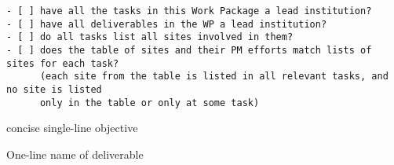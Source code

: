 \begin{draft}
\begin{verbatim}
- [ ] have all the tasks in this Work Package a lead institution?
- [ ] have all deliverables in the WP a lead institution?
- [ ] do all tasks list all sites involved in them?
- [ ] does the table of sites and their PM efforts match lists of sites for each task?
      (each site from the table is listed in all relevant tasks, and no site is listed
      only in the table or only at some task)
\end{verbatim}
\end{draft}

\begin{workpackage}[
  id=template,
  wphases=0-36,
  swsites,
  title=Work Package Title,
  short=ShortTitle,
  lead=XXX,
  SRLRM=1,
  XXXRM=2,
]

\begin{wpobjectives}
 \begin{compactitem}
   \item concise single-line objective
 \end{compactitem}
\end{wpobjectives}

\begin{wpdescription}


\end{wpdescription}

\begin{tasklist}

\end{tasklist}


\begin{wpdelivs}
\begin{wpdeliv}[
    id=deliv,
    lead=XXX,
    due=12,
    miles=startup,
    dissem=PU,
    nature=DEC,
]
  {
  One-line name of deliverable
  }
\end{wpdeliv}
\end{wpdelivs}
\end{workpackage}

